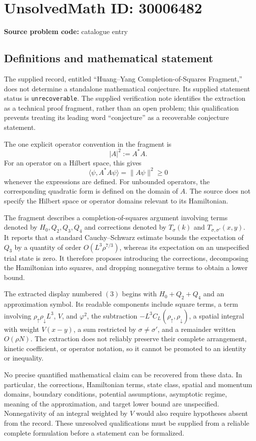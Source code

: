 \documentclass[11pt]{article}
\begin{document}
\section*{UnsolvedMath ID: 30006482}
\textbf{Source problem code:} catalogue entry
\subsection{Definitions and mathematical statement}
The supplied record, entitled ``Huang--Yang Completion-of-Squares Fragment,'' does not determine a standalone mathematical conjecture. Its supplied statement status is \texttt{unrecoverable}. The supplied verification note identifies the extraction as a technical proof fragment, rather than an open problem; this qualification prevents treating its leading word ``conjecture'' as a recoverable conjecture statement.

The one explicit operator convention in the fragment is
\[
|A|^{2}:=A^{*}A.
\]
For an operator on a Hilbert space, this gives
\[
\langle\psi,A^{*}A\psi\rangle=\|A\psi\|^{2}\geq 0
\]
whenever the expressions are defined. For unbounded operators, the corresponding quadratic form is defined on the domain of \(A\). The source does not specify the Hilbert space or operator domains relevant to its Hamiltonian.

The fragment describes a completion-of-squares argument involving terms denoted by \(H_0,Q_2,Q_3,Q_4\) and corrections denoted by \(T_{\sigma}(k)\) and \(T_{\sigma,\sigma'}(x,y)\). It reports that a standard Cauchy--Schwarz estimate bounds the expectation of \(Q_3\) by a quantity of order \(O(L^{3}\rho^{7/3})\), whereas its expectation on an unspecified trial state is zero. It therefore proposes introducing the corrections, decomposing the Hamiltonian into squares, and dropping nonnegative terms to obtain a lower bound.

The extracted display numbered \((3)\) begins with \(H_0+Q_2+Q_4\) and an approximation symbol. Its readable components include square terms, a term involving \(\rho_{\uparrow}\rho_{\downarrow}L^{3}\), \(V\), and \(\varphi^{2}\), the subtraction \(-L^{3}C_L(\rho_{\uparrow},\rho_{\downarrow})\), a spatial integral with weight \(V(x-y)\), a sum restricted by \(\sigma\ne\sigma'\), and a remainder written \(O(\rho N)\). The extraction does not reliably preserve their complete arrangement, kinetic coefficient, or operator notation, so it cannot be promoted to an identity or inequality.

No precise quantified mathematical claim can be recovered from these data. In particular, the corrections, Hamiltonian terms, state class, spatial and momentum domains, boundary conditions, potential assumptions, asymptotic regime, meaning of the approximation, and target lower bound are unspecified. Nonnegativity of an integral weighted by \(V\) would also require hypotheses absent from the record. These unresolved qualifications must be supplied from a reliable complete formulation before a statement can be formalized.
\end{document}
